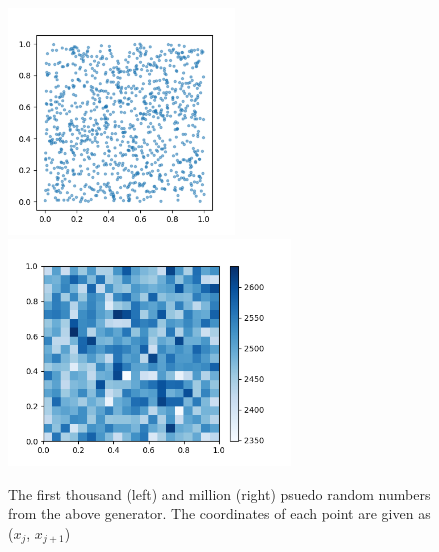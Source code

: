         \begin{figure}[H]
            \centering
            \includegraphics[height=6cm]{output/RNG_scatter.png}
            \includegraphics[height=6cm]{output/RNG_hist2d.png}
            \caption{The first thousand (left) and million (right) psuedo random numbers from the above generator. The coordinates of each point are given as  ($x_j$, $x_{j+1}$)}
            \label{fig:rng}
        \end{figure}
        